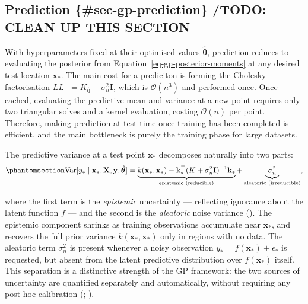 \documentclass[
  letterpaper,
  DIV=11,
  numbers=noendperiod]{scrartcl}
\begin{document}
\subsection{Prediction \{\#sec-gp-prediction\} /TODO: CLEAN UP THIS
SECTION}\label{prediction-sec-gp-prediction-todo-clean-up-this-section}

With hyperparameters fixed at their optimised values
\(\hat{\boldsymbol{\theta}}\), prediction reduces to evaluating the
posterior from Equation~\ref{eq-gp-posterior-moments} at any desired
test location \(\mathbf{x}_*\). The main cost for a prediciton is
forming the Cholesky factorisation
\(LL^\top = K_{\hat{\boldsymbol{\theta}}} + \sigma_n^2\mathbf{I}\),
which is \(\mathcal{O}(n^3)\) and performed once. Once cached,
evaluating the predictive mean and variance at a new point requires only
two triangular solves and a kernel evaluation, costing
\(\mathcal{O}(n)\) per point. Therefore, making prediction at test time
once training has been completed is efficient, and the main bottleneck
is purely the training phase for large datasets.

The predictive variance at a test point \(\mathbf{x}_*\) decomposes
naturally into two parts:
\begin{equation}\phantomsection\label{eq-variance-decomposition}{
\operatorname{Var}[y_* \mid \mathbf{x}_*, \mathbf{X}, \mathbf{y}, \hat{\boldsymbol{\theta}}]
= \underbrace{k(\mathbf{x}_*, \mathbf{x}_*) - \mathbf{k}_*^\top(K + \sigma_n^2\mathbf{I})^{-1}\mathbf{k}_*}_{\text{epistemic (reducible)}}
+ \underbrace{\sigma_n^2}_{\text{aleatoric (irreducible)}},
}\end{equation}

where the first term is the \emph{epistemic} uncertainty --- reflecting
ignorance about the latent function \(f\) --- and the second is the
\emph{aleatoric} noise variance
(). The epistemic
component shrinks as training observations accumulate near
\(\mathbf{x}_*\), and recovers the full prior variance
\(k(\mathbf{x}_*, \mathbf{x}_*)\) only in regions with no data. The
aleatoric term \(\sigma_n^2\) is present whenever a noisy observation
\(y_* = f(\mathbf{x}_*) + \epsilon_*\) is requested, but absent from the
latent predictive distribution over \(f(\mathbf{x}_*)\) itself. This
separation is a distinctive strength of the GP framework: the two
sources of uncertainty are quantified separately and automatically,
without requiring any post-hoc calibration
(;
).
\end{document}
